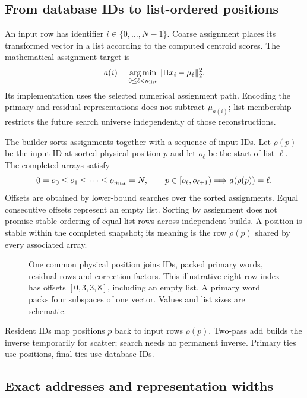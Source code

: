 \subsection{From database IDs to list-ordered positions}

An input row has identifier $i\in\{0,\ldots,N-1\}$. Coarse assignment
places its transformed vector in a list according to the computed
centroid scores. The mathematical assignment target is
\begin{equation}
 a(i)=\operatorname*{arg\,min}_{0\leq\ell<n_{\rm list}}
       \|\Pi x_i-\mu_\ell\|_2^2.
 \label{eq:4-assignment}
\end{equation}
Its implementation uses the selected numerical assignment path. Encoding
the primary and residual representations does not subtract $\mu_{a(i)}$;
list membership restricts the future search universe independently of
those reconstructions.

The builder sorts assignments together with a sequence of input IDs.
Let $\rho(p)$ be the input ID at sorted physical position $p$ and let
$o_\ell$ be the start of list $\ell$. The completed arrays satisfy
\begin{equation}
 0=o_0\leq o_1\leq\cdots\leq o_{n_{\rm list}}=N,
 \qquad p\in[o_\ell,o_{\ell+1})\Longrightarrow a(\rho(p))=\ell.
 \label{eq:4-offsets}
\end{equation}
Offsets are obtained by lower-bound searches over the sorted assignments.
Equal consecutive offsets represent an empty list. Sorting by assignment
does not promise stable ordering of equal-list rows across independent
builds. A position is stable within the completed snapshot; its meaning
is the row $\rho(p)$ shared by every associated array.

\begin{figure}[tbp]
\centering

\caption[List-ordered physical index layout]{One common physical position joins IDs, packed primary words,
residual rows and correction factors. This illustrative eight-row index
has offsets $[0,3,3,8]$, including an empty list. A primary word packs
four subspaces of one vector. Values and list sizes are schematic.}
\label{fig:4-layout}
\end{figure}

Resident IDs map positions $p$ back to input rows $\rho(p)$. Two-pass add builds the inverse temporarily for scatter; search needs no permanent inverse. Primary ties use positions, final ties use database IDs.

\subsection{Exact addresses and representation widths}

